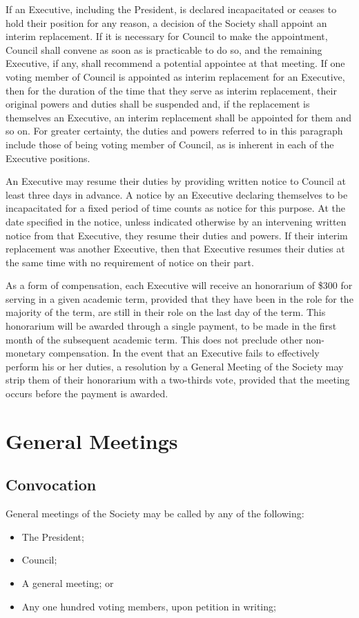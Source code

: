 If an Executive, including the President, is declared incapacitated or ceases to
hold their position for any reason, a decision of the Society shall appoint an
interim replacement. If it is necessary for Council to make the appointment,
Council shall convene as soon as is practicable to do so, and the remaining
Executive, if any, shall recommend a potential appointee at that meeting. If one
voting member of Council is appointed as interim replacement for an Executive,
then for the duration of the time that they serve as interim replacement, their
original powers and duties shall be suspended and, if the replacement is
themselves an Executive, an interim replacement shall be appointed for them and
so on. For greater certainty, the duties and powers referred to in this
paragraph include those of being voting member of Council, as is inherent in
each of the Executive positions.

An Executive may resume their duties by providing written notice to Council at
least three days in advance. A notice by an Executive declaring themselves to be
incapacitated for a fixed period of time counts as notice for this purpose. At
the date specified in the notice, unless indicated otherwise by an intervening
written notice from that Executive, they resume their duties and powers. If
their interim replacement was another Executive, then that Executive resumes
their duties at the same time with no requirement of notice on their part.

As a form of compensation, each Executive will receive an honorarium of \$300
for serving in a given academic term, provided that they have been in the role
for the majority of the term, are still in their role on the last day of the
term. This honorarium will be awarded through a single payment, to be made in
the first month of the subsequent academic term. This does not preclude other
non-monetary compensation. In the event that an Executive fails to effectively
perform his or her duties, a resolution by a General Meeting of the Society may
strip them of their honorarium with a two-thirds vote, provided that the meeting
occurs before the payment is awarded.

\section{General Meetings}
\subsection{Convocation}
General meetings of the Society may be called by any of the following:
\begin{itemize}
  \item The President;
  \item Council;
  \item A general meeting; or
  \item Any one hundred voting members, upon petition in writing;
\end{itemize}

